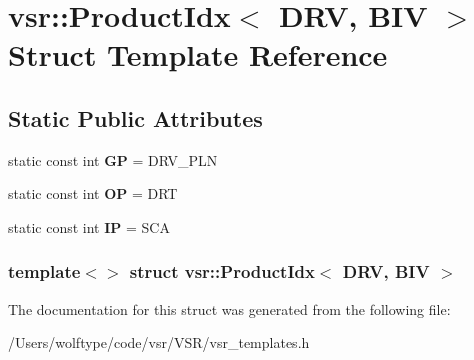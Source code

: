 \hypertarget{structvsr_1_1_product_idx_3_01_d_r_v_00_01_b_i_v_01_4}{\section{vsr\-:\-:Product\-Idx$<$ D\-R\-V, B\-I\-V $>$ Struct Template Reference}
\label{structvsr_1_1_product_idx_3_01_d_r_v_00_01_b_i_v_01_4}
}
\subsection*{Static Public Attributes}
\begin{DoxyCompactItemize}
\item 
\hypertarget{structvsr_1_1_product_idx_3_01_d_r_v_00_01_b_i_v_01_4_a2c807a6cbd4c7018dc6861fba9b7156a}{static const int {\bfseries G\-P} = D\-R\-V\-\_\-\-P\-L\-N}\label{structvsr_1_1_product_idx_3_01_d_r_v_00_01_b_i_v_01_4_a2c807a6cbd4c7018dc6861fba9b7156a}

\item 
\hypertarget{structvsr_1_1_product_idx_3_01_d_r_v_00_01_b_i_v_01_4_a2b97c00cdfcfc2ecf3070786893ebbd3}{static const int {\bfseries O\-P} = D\-R\-T}\label{structvsr_1_1_product_idx_3_01_d_r_v_00_01_b_i_v_01_4_a2b97c00cdfcfc2ecf3070786893ebbd3}

\item 
\hypertarget{structvsr_1_1_product_idx_3_01_d_r_v_00_01_b_i_v_01_4_accc8c7c6f6e7106c8c31eb2cd59a9ebd}{static const int {\bfseries I\-P} = S\-C\-A}\label{structvsr_1_1_product_idx_3_01_d_r_v_00_01_b_i_v_01_4_accc8c7c6f6e7106c8c31eb2cd59a9ebd}

\end{DoxyCompactItemize}
\subsubsection*{template$<$$>$ struct vsr\-::\-Product\-Idx$<$ D\-R\-V, B\-I\-V $>$}



The documentation for this struct was generated from the following file\-:\begin{DoxyCompactItemize}
\item 
/\-Users/wolftype/code/vsr/\-V\-S\-R/vsr\-\_\-templates.\-h\end{DoxyCompactItemize}
